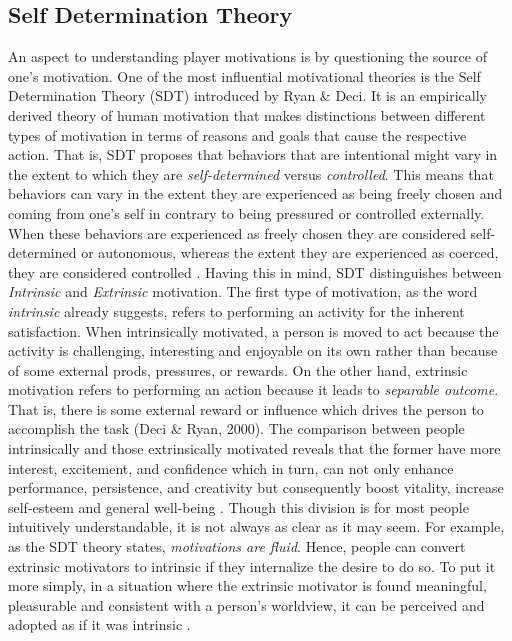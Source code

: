 \subsection{Self Determination Theory}
An aspect to understanding player motivations is by questioning the source of one's motivation. One of the most influential motivational theories is the Self Determination Theory (SDT) introduced by Ryan \& Deci. It is an empirically derived theory of human motivation that makes distinctions between different types of motivation in terms of reasons and goals that cause the respective action. That is, SDT proposes that behaviors that are intentional might vary in the extent to which they are \textit{self-determined} versus \textit{controlled}. This means that behaviors can vary in the extent they are experienced as being freely chosen and coming from one's self in contrary to being pressured or controlled externally. When these behaviors are experienced as freely chosen they are considered self-determined or autonomous, whereas the extent they are experienced as coerced, they are considered controlled \cite{deci1994promoting}. Having this in mind, SDT distinguishes between \textit{Intrinsic} and \textit{Extrinsic} motivation. The first type of motivation, as the word \textit{intrinsic} already suggests, refers to performing an activity for the inherent satisfaction. When intrinsically motivated, a person is moved to act because the activity is challenging, interesting and enjoyable on its own rather than because of some external prods, pressures, or rewards. On the other hand, extrinsic motivation refers to performing an action because it leads to \textit{separable outcome}. That is, there is some external reward or influence which drives the person to accomplish the task (Deci  \& Ryan, 2000). The comparison between people intrinsically and those extrinsically motivated reveals that the former have more interest, excitement, and confidence which in turn, can not only enhance performance, persistence, and creativity but consequently boost vitality, increase self-esteem and general well-being \cite{ryan2000self}. Though this division is for most people intuitively understandable, it is not always as clear as it may seem. For example, as the SDT theory states, \textit{motivations are fluid}. Hence, people can convert extrinsic motivators to intrinsic if they internalize the desire to do so. To put it more simply, in a situation where the extrinsic motivator is found meaningful, pleasurable and consistent with a person's worldview, it can be perceived and adopted as if it was intrinsic \cite{zichermann2012}.
